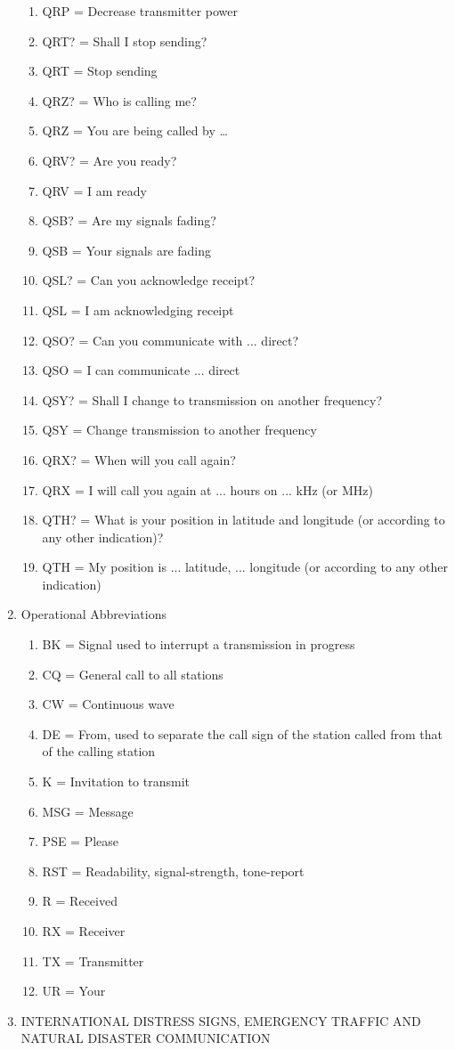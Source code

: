 \begin{enumerate}[noitemsep]
\begin{enumerate}[noitemsep]
\item QRP  = Decrease transmitter power
\item QRT? = Shall I stop sending?
\item QRT  = Stop sending
\item QRZ? = Who is calling me?
\item QRZ  = You are being called by …
\item QRV? = Are you ready?
\item QRV  = I am ready
\item QSB? = Are my signals fading?
\item QSB  = Your signals are fading
\item QSL? = Can you acknowledge receipt?
\item QSL  = I am acknowledging receipt
\item QSO? = Can you communicate with ... direct?
\item QSO  = I can communicate ... direct
\item QSY? = Shall I change to transmission on another frequency?
\item QSY  = Change transmission to another frequency
\item QRX? = When will you call again?
\item QRX  = I will call you again at ... hours on ... kHz (or MHz)
\item QTH? = What is your position in latitude and longitude (or according to any other indication)?
\item QTH  = My position is  ... latitude, ... longitude (or according to any other indication)
\end{enumerate}
\item Operational Abbreviations
\begin{enumerate}
\item BK = Signal used to interrupt a transmission in progress
\item CQ = General call to all stations
\item CW = Continuous wave
\item DE = From, used to separate the call sign of the station called from that of the calling station
\item K = Invitation to transmit
\item MSG = Message
\item PSE = Please
\item RST = Readability, signal-strength, tone-report
\item R = Received
\item RX = Receiver
\item TX = Transmitter
\item UR = Your
\end{enumerate}
\item INTERNATIONAL DISTRESS SIGNS, EMERGENCY TRAFFIC AND NATURAL DISASTER COMMUNICATION


\end{enumerate}
